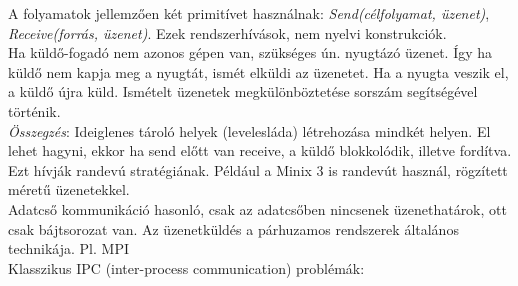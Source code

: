 \documentclass[margin=0px]{article}
\begin{document}
A folyamatok jellemzően két primitívet használnak: \textit{Send(célfolyamat, üzenet)}, \textit{Receive(forrás, üzenet)}. Ezek rendszerhívások, nem nyelvi konstrukciók. \\
Ha küldő-fogadó nem azonos gépen van, szükséges ún. nyugtázó üzenet. Így ha küldő nem kapja meg a nyugtát, ismét elküldi az üzenetet. Ha a nyugta veszik el, a küldő újra küld. Ismételt üzenetek megkülönböztetése sorszám segítségével történik. \\
\textit{Összegzés}: Ideiglenes tároló helyek (levelesláda) létrehozása mindkét helyen. El lehet hagyni, ekkor ha send előtt van receive, a küldő blokkolódik, illetve fordítva. Ezt hívják randevú stratégiának. Például a  Minix 3 is randevút használ, rögzített méretű üzenetekkel. \\
Adatcső kommunikáció hasonló, csak az adatcsőben nincsenek üzenethatárok, ott csak bájtsorozat van. Az üzenetküldés a párhuzamos rendszerek általános technikája. Pl. MPI \\
Klasszikus IPC (inter-process communication) problémák:
\end{document}
